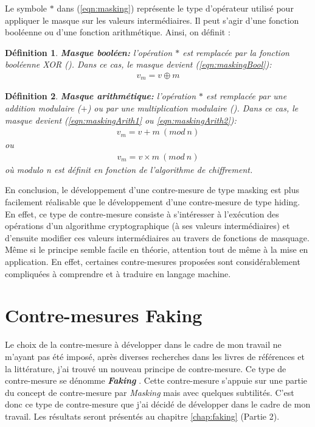 \documentclass[oneside]{book}
\newtheorem{definition}{Définition}[section]
\begin{document}
\hspace{-0.5cm}Le symbole $*$ dans (\ref{eqn:masking}) représente le type d'opérateur utilisé pour appliquer le masque sur les valeurs intermédiaires. Il peut s'agir d'une fonction booléenne ou d'une fonction arithmétique. Ainsi, on définit : 

\theoremstyle{definition}
\begin{definition}{\textbf{Masque booléen:}}
l'opération $*$ est remplacée par la fonction booléenne XOR (\oplus). Dans ce cas, le masque devient (\ref{eqn:maskingBool}):
\begin{gather}
	v_m = v \oplus m\label{eqn:maskingBool}
\end{gather}
\end{definition}
\theoremstyle{definition}
\begin{definition}{\textbf{Masque arithmétique:}}
l'opération $*$ est remplacée par une addition modulaire ($+$) ou par une multiplication modulaire (\times ). Dans ce cas, le masque devient (\ref{eqn:maskingArith1} ou \ref{eqn:maskingArith2}): 
\begin{gather}
	v_m = v + m \ (mod \ n)\label{eqn:maskingArith1}
\end{gather}
ou
\begin{gather}
	v_m = v \times m \ (mod \ n)\label{eqn:maskingArith2}
\end{gather}
où \textit{modulo n} est définit en fonction de l'algorithme de chiffrement.
\end{definition}

En conclusion, le développement d'une contre-mesure de type masking est plus facilement réalisable que le développement d'une contre-mesure de type hiding. En effet, ce type de contre-mesure consiste à s'intéresser à l'exécution des opérations d'un algorithme cryptographique (à ses valeurs intermédiaires) et d'ensuite modifier ces valeurs intermédiaires au travers de fonctions de masquage. Même si le principe semble facile en théorie, attention tout de même à la mise en application. En effet, certaines contre-mesures proposées sont considérablement compliquées à comprendre et à traduire en langage machine.

\section{Contre-mesures Faking}
\label{sec:faking}

Le choix de la contre-mesure à développer dans le cadre de mon travail ne m'ayant pas été imposé, après diverses recherches dans les livres de références \cite{mangard_power_2007}\cite{peeters_advanced_2013} et la littérature, j'ai trouvé un nouveau principe de contre-mesure. Ce type de contre-mesure se dénomme \textbf{\textit{Faking}} \cite{lumbiarres-lopez_faking_2018}. Cette contre-mesure s'appuie sur une partie du concept de contre-mesure par \textit{Masking} mais avec quelques subtilités. C'est donc ce type de contre-mesure que j'ai décidé de développer dans le cadre de mon travail. Les résultats seront présentés au chapitre \ref{chap:faking} (Partie 2).
\end{document}
